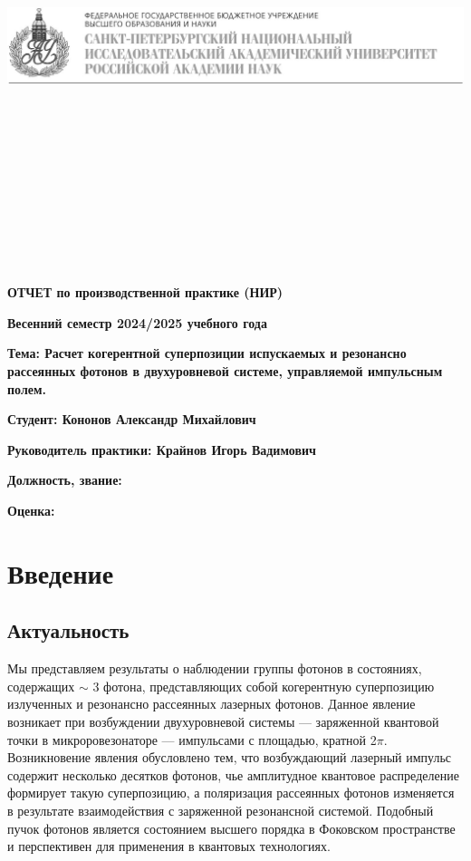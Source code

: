 \documentclass[11pt]{article}    %
\begin{document}
\begin{titlepage}

\includegraphics[scale = 0.43]{alf4.JPG}

\

\

\

\

\

\

\begin{center}
    {\bf ОТЧЕТ по производственной практике (НИР)}

    {\bf Весенний семестр 2024/2025 учебного года}

    {\bf Тема: Расчет когерентной суперпозиции испускаемых и резонансно рассеянных фотонов в двухуровневой системе, управляемой импульсным полем.}

\end{center}

    {\bf Студент: Кононов Александр Михайлович}

    {\bf Руководитель практики: Крайнов Игорь Вадимович}

    {\bf Должность, звание:}

    {\bf Оценка:}

\end{titlepage}

\tableofcontents
\newpage

\section{Введение}
\subsection{Актуальность}

Мы представляем результаты о наблюдении группы фотонов в состояниях,
содержащих $\sim$ 3 фотона, представляющих собой когерентную суперпозицию
излученных и резонансно рассеянных лазерных фотонов. Данное явление
возникает при возбуждении двухуровневой системы — заряженной квантовой
точки в микроровезонаторе — импульсами с площадью, кратной 2$\pi$.
Возникновение явления обусловлено тем, что возбуждающий лазерный импульс
содержит несколько десятков фотонов, чье амплитудное квантовое
распределение формирует такую суперпозицию, а поляризация рассеянных
фотонов изменяется в результате взаимодействия с заряженной резонансной
системой. Подобный пучок фотонов является состоянием высшего порядка в
Фоковском пространстве и перспективен для применения в квантовых
технологиях.
\end{document}
